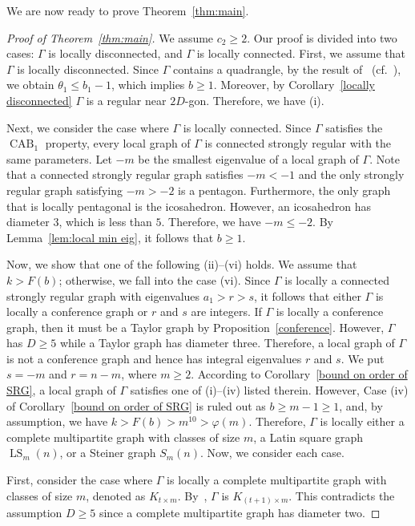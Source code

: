 We are now ready to prove Theorem~\ref{thm:main}.
\begin{proof}[Proof of Theorem~\ref{thm:main}] 
We assume $c_2\geqslant 2$.
Our proof is divided into two cases: $\Gamma$ is locally disconnected, and $\Gamma$ is locally connected.
First, we assume that $\Gamma$ is locally disconnected.
Since $\Gamma$ contains a quadrangle, by the result of~\cite{Terwilliger1985} (cf.~\cite[p.~170]{BCN}), we obtain $\theta_1 \leqslant b_1-1$, which implies $b \geqslant 1$.
Moreover, by Corollary~\ref{locally disconnected} $\Gamma$ is a regular near $2D$-gon. Therefore, we have (i).

Next, we consider the case where $\Gamma$ is locally connected.
Since $\Gamma$ satisfies the $\operatorname{CAB}_1$ property, every local graph of $\Gamma$ is connected strongly regular with the same parameters.
Let $-m$ be the smallest eigenvalue of a local graph of $\Gamma$. 
Note that a connected strongly regular graph satisfies $-m < -1$ and the only strongly regular graph satisfying $-m > -2$ is a pentagon.
Furthermore, the only graph that is locally pentagonal is the icosahedron.
However, an icosahedron has diameter $3$, which is less than $5$.
Therefore, we have $-m \leqslant -2$. 
By Lemma~\ref{lem:local min eig}, it follows that $b\geqslant 1$.

Now, we show that one of the following (ii)--(vi) holds.
We assume that $k > F(b)$; otherwise, we fall into the case (vi).
Since $\Gamma$ is locally a connected strongly regular graph with eigenvalues $a_1>r>s$, it follows that either $\Gamma$ is locally a conference graph or $r$ and $s$ are integers.
If $\Gamma$ is locally a conference graph, then it must be a Taylor graph by Proposition~\ref{conference}.
However, $\Gamma$ has $D\geqslant 5$ while a Taylor graph has diameter three. 
Therefore, a local graph of $\Gamma$ is not a conference graph and hence has integral eigenvalues $r$ and $s$. 
We put $s=-m$ and $r=n-m$, where $m\geqslant 2$.
According to Corollary~\ref{bound on order of SRG}, a local graph of $\Gamma$ satisfies one of (i)--(iv) listed therein. 
However, Case (iv) of Corollary~\ref{bound on order of SRG} is ruled out as $b \geqslant m-1 \geqslant 1$, and, by assumption, we have $k > F(b) > m^{10} > \varphi(m)$.
Therefore, $\Gamma$ is locally either a complete multipartite graph with classes of size $m$, a Latin square graph $\operatorname{LS}_m(n)$, or a Steiner graph $S_m(n)$.
Now, we consider each case.

First, consider the case where $\Gamma$ is locally a complete multipartite graph with classes of size $m$, denoted as $K_{t \times m}$. 
By~\cite[Proposition 1.1.5]{BCN}, $\Gamma$ is $K_{(t+1) \times m}$. 
This contradicts the assumption $D \geqslant 5$ since a complete multipartite graph has diameter two. 	


\end{proof}
